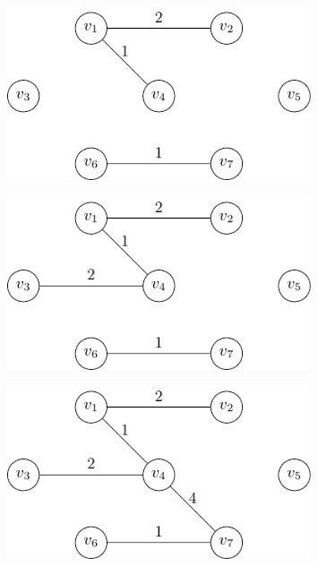 \begin{minipage}{0.25\textwidth}
\begin{figure}[H]
  \centering
  \includegraphics[width=0.8\textwidth]{Figure/Kruskal_algo_d4.pdf}
\end{figure}
\end{minipage}
\begin{minipage}{0.25\textwidth}
\begin{figure}[H]
  \centering
  \includegraphics[width=0.8\textwidth]{Figure/Kruskal_algo_d5.pdf}
\end{figure}
\end{minipage}
\begin{minipage}{0.25\textwidth}
\begin{figure}[H]
  \centering
  \includegraphics[width=0.8\textwidth]{Figure/Kruskal_algo_d6.pdf}
\end{figure}
\end{minipage}
